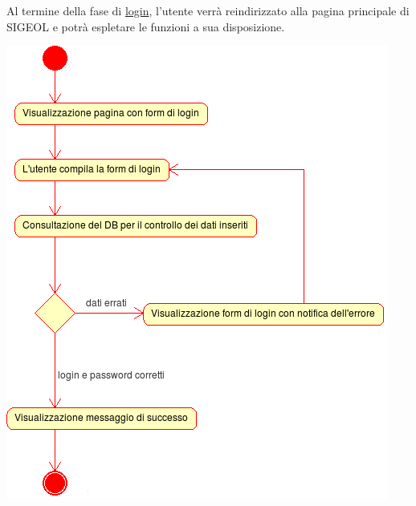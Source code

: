 \documentclass[11pt,a4paper]{article}
\begin{document}
Al termine della fase di \underline{login}, l'utente verrà reindirizzato alla pagina principale di SIGEOL e potrà espletare le funzioni a sua disposizione.\\
\begin{center}
 \includegraphics[scale=1]{images/login.png}
\end{center}

\newpage
\end{document}
